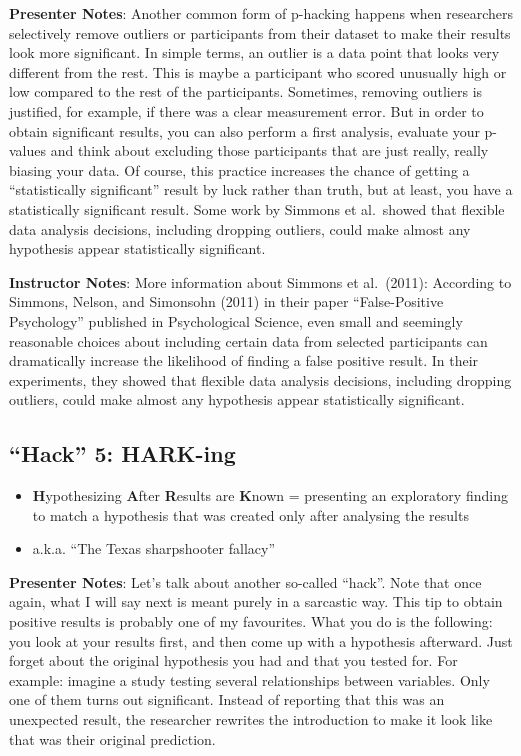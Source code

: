 \documentclass[
  letterpaper,
  DIV=11,
  numbers=noendperiod]{scrartcl}
\providecommand{\tightlist}{%
  \setlength{\itemsep}{0pt}\setlength{\parskip}{0pt}}
\begin{document}
\textbf{Presenter Notes}: Another common form of p-hacking happens when
researchers selectively remove outliers or participants from their
dataset to make their results look more significant. In simple terms, an
outlier is a data point that looks very different from the rest. This is
maybe a participant who scored unusually high or low compared to the
rest of the participants. Sometimes, removing outliers is justified, for
example, if there was a clear measurement error. But in order to obtain
significant results, you can also perform a first analysis, evaluate
your p-values and think about excluding those participants that are just
really, really biasing your data. Of course, this practice increases the
chance of getting a ``statistically significant'' result by luck rather
than truth, but at least, you have a statistically significant result.
Some work by Simmons et al.~showed that flexible data analysis
decisions, including dropping outliers, could make almost any hypothesis
appear statistically significant.

\textbf{Instructor Notes}: More information about Simmons et al.~(2011):
According to Simmons, Nelson, and Simonsohn (2011) in their paper
``False-Positive Psychology'' published in Psychological Science, even
small and seemingly reasonable choices about including certain data from
selected participants can dramatically increase the likelihood of
finding a false positive result. In their experiments, they showed that
flexible data analysis decisions, including dropping outliers, could
make almost any hypothesis appear statistically significant.

\subsection{``Hack'' 5: HARK-ing}\label{hack-5-hark-ing}

\begin{itemize}
\tightlist
\item
  \textbf{H}ypothesizing \textbf{A}fter \textbf{R}esults are
  \textbf{K}nown = presenting an exploratory finding to match a
  hypothesis that was created only after analysing the results
\item
  a.k.a. ``The Texas sharpshooter fallacy''
\end{itemize}

\textbf{Presenter Notes}: Let's talk about another so-called ``hack''.
Note that once again, what I will say next is meant purely in a
sarcastic way. This tip to obtain positive results is probably one of my
favourites. What you do is the following: you look at your results
first, and then come up with a hypothesis afterward. Just forget about
the original hypothesis you had and that you tested for. For example:
imagine a study testing several relationships between variables. Only
one of them turns out significant. Instead of reporting that this was an
unexpected result, the researcher rewrites the introduction to make it
look like that was their original prediction.
\end{document}
